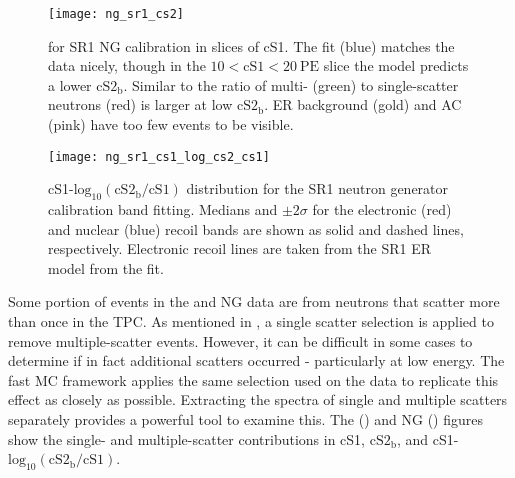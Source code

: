 \begin{figure}
\centering
\texttt{[image: ng\_sr1\_cs2]}
\caption[\cstwob for SR1 NG calibration in slices of cS1.]{\cstwob for SR1 NG calibration in slices of cS1.  The fit (blue) matches the data
nicely, though in the
$10 < \mathrm{cS1} < 20\ \mathrm{PE}$ slice the model predicts a lower $\mathrm{cS2_b}$.  Similar to \ambe the ratio of multi-
(green) to single-scatter neutrons (red) is larger at low $\mathrm{cS2_b}$.  ER background (gold) and AC (pink) have too few events
to be visible.}
\label{fig:er_nr_calibrations_results_ng_sr1_cs2}
\end{figure}

\begin{figure}
\centering
\texttt{[image: ng\_sr1\_cs1\_log\_cs2\_cs1]}
\caption[cS1-$\mathrm{log}_{10}(\mathrm{cS2_b / cS1})$ distribution for the SR1 neutron generator calibration band fitting.  Medians and
$\pm 2\sigma$ for the electronic and nuclear recoil bands are shown.]{cS1-$\mathrm{log}_{10}(\mathrm{cS2_b / cS1})$ distribution for the SR1
neutron generator calibration band fitting.  Medians and
$\pm 2\sigma$ for the electronic (red) and nuclear (blue) recoil bands are shown as solid and dashed lines, respectively.  Electronic
recoil lines are taken from the SR1 ER model from the fit.}
\label{fig:er_nr_calibrations_results_ng_sr1_cs1_log_cs2_cs1}
\end{figure}

Some portion of events in the \ambe and NG data are from neutrons that scatter more than once in the TPC.  As mentioned in
, a single scatter selection is applied to remove multiple-scatter
events.  However,
it can be difficult in some cases to determine if in fact additional scatters occurred - particularly at low energy.  The fast MC framework
applies the same selection used on the data to replicate this effect as closely as possible.  Extracting the spectra of single and
multiple scatters separately provides a powerful tool to examine this.  The \ambe
()
and NG
()
figures show the single-
and multiple-scatter contributions in cS1, $\mathrm{cS2_b}$, and cS1-$\mathrm{log}_{10}(\mathrm{cS2_b/cS1})$.

